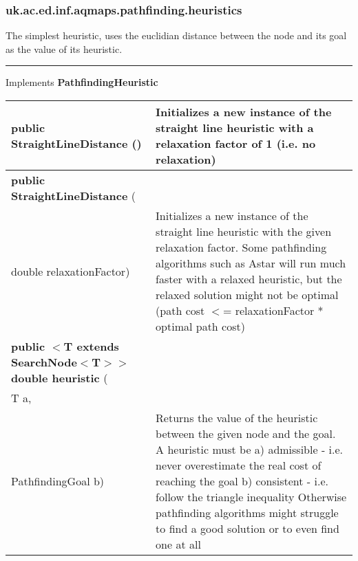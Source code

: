  { 
 
}
 { 
 
}
 { 
 
}
 { 
 
}
\subsubsection{ uk.ac.ed.inf.aqmaps.pathfinding.heuristics }
 { The simplest heuristic, uses the euclidian distance between the node and its goal as the value of its heuristic.
 
\vspace*{4pt} \hrule \vspace*{3pt}
Implements \textbf{ PathfindingHeuristic }
\begin{tabular}{ p{3in}|m{3.4in}}
\textbf{public StraightLineDistance} () & Initializes a new instance of the straight line heuristic with a relaxation factor of 1 (i.e. no relaxation)\\ \hline 
\textbf{public StraightLineDistance } (\\ \hspace*{ 5pt} double relaxationFactor) & Initializes a new instance of the straight line heuristic with the given relaxation factor. Some pathfinding algorithms such as Astar will run much faster \newline%
 with a relaxed heuristic, but the relaxed solution might not be optimal (path cost $<$= relaxationFactor * optimal path cost)\\ \hline 
\textbf{public $<$T extends SearchNode$<$T$>$$>$ double heuristic } (\\ \hspace*{ 5pt} T a,\\\hspace*{ 5pt} PathfindingGoal b) & Returns the value of the heuristic between the given node and the goal. A heuristic must be \newline%
 a) admissible {-} i.e. never overestimate the real cost of reaching the goal\newline%
 b) consistent {-} i.e. follow the triangle inequality\newline%
 Otherwise pathfinding algorithms might struggle to find a good solution or to even find one at all\\ \hline 
\end{tabular}
}
